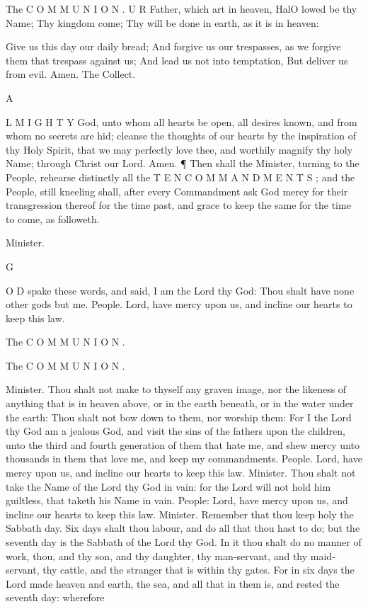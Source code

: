 The C O M M U N I O N . U R Father, which art in heaven, HalO lowed be thy Name; Thy kingdom come; Thy will be done in earth, as it is in heaven:

Give us this day our daily bread; And forgive us our trespasses, as we forgive them that trespass against us; And lead us not into temptation, But deliver us from evil. Amen. The Collect.

A

L M I G H T Y God, unto whom all hearts be open, all desires known, and from whom no secrets are hid; cleanse the thoughts of our hearts by the inspiration of thy Holy Spirit, that we may perfectly love thee, and worthily magnify thy holy Name; through Christ our Lord. Amen. ¶ Then shall the Minister, turning to the People, rehearse distinctly all the T E N C O M M A N D M E N T S ; and the People, still kneeling shall, after every Commandment ask God mercy for their transgression thereof for the time past, and grace to keep the same for the time to come, as followeth.

Minister.

G

O D spake these words, and said, I am the Lord thy God: Thou shalt have none other gods but me. People. Lord, have mercy upon us, and incline our hearts to keep this law.

The C O M M U N I O N .

The C O M M U N I O N .

Minister. Thou shalt not make to thyself any graven image, nor the likeness of anything that is in heaven above, or in the earth beneath, or in the water under the earth: Thou shalt not bow down to them, nor worship them: For I the Lord thy God am a jealous God, and visit the sins of the fathers upon the children, unto the third and fourth generation of them that hate me, and shew mercy unto thousands in them that love me, and keep my commandments. People. Lord, have mercy upon us, and incline our hearts to keep this law. Minister. Thou shalt not take the Name of the Lord thy God in vain: for the Lord will not hold him guiltless, that taketh his Name in vain. People: Lord, have mercy upon us, and incline our hearts to keep this law. Minister. Remember that thou keep holy the Sabbath day. Six days shalt thou labour, and do all that thou hast to do; but the seventh day is the Sabbath of the Lord thy God. In it thou shalt do no manner of work, thou, and thy son, and thy daughter, thy man-servant, and thy maid-servant, thy cattle, and the stranger that is within thy gates. For in six days the Lord made heaven and earth, the sea, and all that in them is, and rested the seventh day: wherefore

